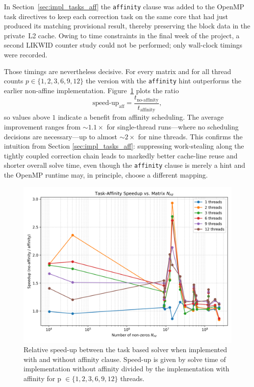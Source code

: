 In Section~\ref{sec:impl_tasks_aff} the \texttt{affinity} clause was
added to the OpenMP task directives to keep each correction task on the
same core that had just produced its matching provisional result,
thereby preserving the block data in the private~L2 cache.  Owing to
time constraints in the final week of the project, a second LIKWID
counter study could not be performed; only wall-clock timings were
recorded.

Those timings are nevertheless decisive.  For every matrix and for all
thread counts $p\in\{1,2,3,6,9,12\}$ the version with the
\texttt{affinity} hint outperforms the earlier non-affine
implementation.  Figure~\ref{fig:speedup_non_aff_aff} plots the ratio
$$
  \text{speed-up}_{\mathrm{aff}}=\frac{t_{\text{no-affinity}}}{t_{\text{affinity}}},
$$
so values above $1$ indicate a benefit from affinity scheduling.  The
average improvement ranges from $\sim1.1\times$ for single-thread
runs—where no scheduling decisions are necessary—up to almost
$\sim2 \times$ for nine threads.  This confirms the intuition from
Section \ref{sec:impl_tasks_aff}: suppressing work-stealing along the
tightly coupled correction chain leads to markedly better cache-line
reuse and shorter overall solve time, even though the
\texttt{affinity} clause is merely a hint and the OpenMP runtime may, in
principle, choose a different mapping.
\begin{figure}
    \centering
    \includegraphics[width=1\linewidth]{relative_speedup_affinity_non_aff.png}
    \caption{Relative speed-up between the task based solver when implemented with and without affinity clause. Speed-up is given by solve time of implementation without affinity divided by the implementation with affinity for p $\in \{1,2,3,6,9,12 \}$ threads.}
    \label{fig:speedup_non_aff_aff}
\end{figure}


